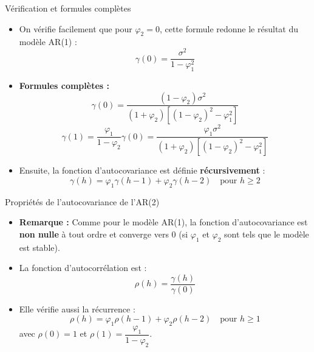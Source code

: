 \documentclass[11pt,aspectratio=169]{beamer}
\begin{document}
\begin{frame}{Vérification et formules complètes}

\begin{itemize}

\item On vérifie facilement que pour $\varphi_2 = 0$, cette formule redonne le résultat du modèle AR(1) :
\[
\gamma(0) = \frac{\sigma^2}{1 - \varphi_1^2}
\]

\item \textbf{Formules complètes :}
\[
\gamma(0) = \frac{(1 - \varphi_2) \sigma^2}{(1 + \varphi_2)[(1 - \varphi_2)^2 - \varphi_1^2]}
\]
\[
\gamma(1) = \frac{\varphi_1}{1 - \varphi_2} \gamma(0) = \frac{\varphi_1 \sigma^2}{(1 + \varphi_2)[(1 - \varphi_2)^2 - \varphi_1^2]}
\]

\item Ensuite, la fonction d'autocovariance est définie \textbf{récursivement} :
\[
\gamma(h) = \varphi_1 \gamma(h-1) + \varphi_2 \gamma(h-2) \quad \text{pour } h \geq 2
\]

\end{itemize}
\end{frame}

\begin{frame}{Propriétés de l'autocovariance de l'AR(2)}

\begin{itemize}

\item \textbf{Remarque :} Comme pour le modèle AR(1), la fonction d'autocovariance est \textbf{non nulle} à tout ordre et converge vers 0 (si $\varphi_1$ et $\varphi_2$ sont tels que le modèle est stable).\newline

\item La fonction d'autocorrélation est :
\[
\rho(h) = \frac{\gamma(h)}{\gamma(0)}
\]

\item Elle vérifie aussi la récurrence :
\[
\rho(h) = \varphi_1 \rho(h-1) + \varphi_2 \rho(h-2) \quad \text{pour } h \geq 1
\]
avec $\rho(0) = 1$ et $\rho(1) = \dfrac{\varphi_1}{1 - \varphi_2}$.

\end{itemize}
\end{frame}
\end{document}
